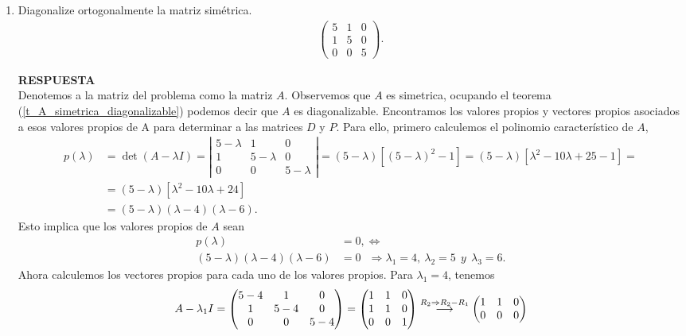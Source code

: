 \documentclass[11pt,letterpaper]{article}
\newcommand{\res}{\textbf{RESPUESTA}\\}
\newcommand{\grstep}[2][\relax]{%
   \ensuremath{\mathrel{
       {\mathop{\longrightarrow}\limits^{#2\mathstrut}_{
                                     \begin{subarray}{l} #1 \end{subarray}}}}}}
\begin{document}
\begin{enumerate}
\item Diagonalize ortogonalmente la matriz simétrica.
\begin{align*}
\begin{pmatrix}
5 & 1 & 0 \\
1 & 5 & 0 \\
0 & 0 & 5
\end{pmatrix}.
\end{align*}

\res Denotemos a la matriz del problema como la matriz $A$. Observemos que $A$ es simetrica, ocupando el teorema (\ref{t_A_simetrica_diagonalizable}) podemos decir que $A$ es diagonalizable. Encontramos los valores propios y vectores propios asociados a esos valores propios de A para determinar a las matrices $D$ y $P$. Para ello, primero calculemos el polinomio característico de $A$,
\begin{align*}
p(\lambda) &= \det (A-\lambda I)=
\left|\begin{array}{ccc}
5-\lambda & 1 & 0 \\
1& 5-\lambda & 0\\
0 & 0 & 5-\lambda
\end{array} \right|
=(5-\lambda)[(5-\lambda)^2-1]=
(5-\lambda)[\lambda^2-10\lambda+25-1]= \\
&=(5-\lambda)[\lambda^2-10\lambda+24]\\
&=(5-\lambda)(\lambda-4)(\lambda-6).
\end{align*}
Esto implica que los valores propios de $A$ sean
\begin{align*}
p(\lambda)&=0,\Leftrightarrow\\
(5-\lambda)(\lambda-4)(\lambda-6)&=0\ \ \ \Rightarrow \lambda_1=4, \ \lambda_2=5 \ \ y \ \ \lambda_3=6.
\end{align*}
Ahora calculemos los vectores propios para cada uno de los valores propios. Para $\lambda_1=4$, tenemos 
\begin{align*}
A-\lambda_1I=\begin{pmatrix}
5-4 & 1 & 0\\
1 & 5-4 & 0\\
0 & 0 & 5-4
\end{pmatrix}=\begin{pmatrix}
1 & 1 & 0\\
1 & 1 & 0\\
0 & 0 & 1
\end{pmatrix}%
\grstep[]{R_2 \Rightarrow R_2-R_1}
%
\begin{pmatrix}
1 & 1 & 0\\
0 & 0 & 0\\

\end{pmatrix}
\end{align*}
\end{enumerate}
\end{document}
